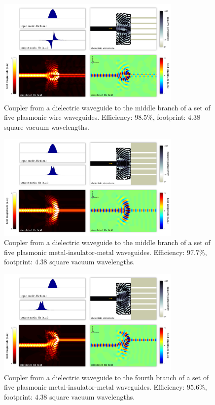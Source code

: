 \begin{figure}[h!]
    \centering
    \includegraphics[width=0.8\textwidth]{p3/18}
    \caption{
        Coupler from a dielectric waveguide to the 
            middle branch of a set of five plasmonic wire waveguides.
        Efficiency: $98.5\%$,
        footprint: $4.38$ square vacuum wavelengths.
        }
\end{figure}
\begin{figure}[h!]
    \centering
    \includegraphics[width=0.8\textwidth]{p3/19}
    \caption{
        Coupler from a dielectric waveguide to the 
            middle branch of a set of five plasmonic 
            metal-insulator-metal waveguides.
        Efficiency: $97.7\%$,
        footprint: $4.38$ square vacuum wavelengths.
        }
\end{figure}
\begin{figure}[h!]
    \centering
    \includegraphics[width=0.8\textwidth]{p3/20}
    \caption{
        Coupler from a dielectric waveguide to the 
            fourth branch of a set of five plasmonic 
            metal-insulator-metal waveguides.
        Efficiency: $95.6\%$,
        footprint: $4.38$ square vacuum wavelengths.
        }
\end{figure}
